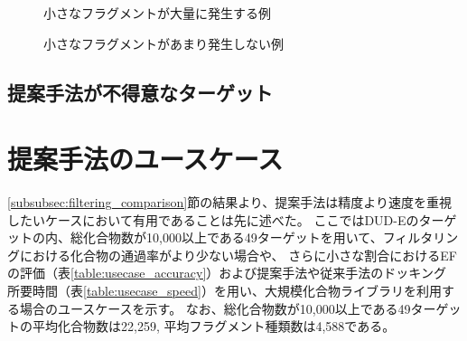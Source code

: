 \begin{figure}[bt]
\begin{minipage}{0.5\hsize}
 \begin{center}
  \caption{小さなフラグメントが大量に発生する例}
  \label{fig:ZINC02599970}
 \end{center}
\end{minipage}
\begin{minipage}{0.5\hsize}
 \begin{center}
  \caption{小さなフラグメントがあまり発生しない例}
  \label{fig:ZINC03782818}
 \end{center}
\end{minipage}
\end{figure}


\subsection{提案手法が不得意なターゲット}



\section{提案手法のユースケース}
\ref{subsubsec:filtering_comparison}節の結果より、提案手法は精度より速度を重視したいケースにおいて有用であることは先に述べた。
ここではDUD-Eのターゲットの内、総化合物数が10,000以上である49ターゲットを用いて、フィルタリングにおける化合物の通過率がより少ない場合や、
さらに小さな割合におけるEFの評価（表\ref{table:usecase_accuracy}）および提案手法や従来手法のドッキング
所要時間（表\ref{table:usecase_speed}）を用い、大規模化合物ライブラリを利用する場合のユースケースを示す。
なお、総化合物数が10,000以上である49ターゲットの平均化合物数は22,259, 平均フラグメント種類数は4,588である。

